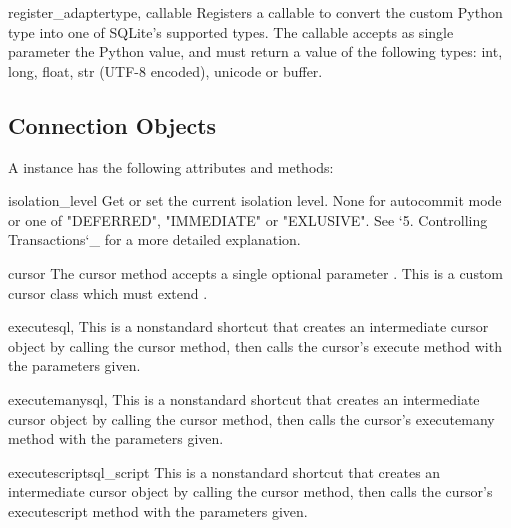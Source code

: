 \begin{funcdesc}{register_adapter}{type, callable}
Registers a callable to convert the custom Python type  into one of
SQLite's supported types. The callable  accepts as single
parameter the Python value, and must return a value of the following types:
int, long, float, str (UTF-8 encoded), unicode or buffer.
\end{funcdesc}


\subsection{Connection Objects \label{sqlite3-Connection-Objects}}

A  instance has the following attributes and methods:

\begin{memberdesc}{isolation_level}
  Get or set the current isolation level. None for autocommit mode or one
  of "DEFERRED", "IMMEDIATE" or "EXLUSIVE". See `5. Controlling
  Transactions`_ for a more detailed explanation.
\end{memberdesc}

\begin{methoddesc}{cursor}{}
  The cursor method accepts a single optional parameter .
  This is a custom cursor class which must extend .
\end{methoddesc}

\begin{methoddesc}{execute}{sql, }
This is a nonstandard shortcut that creates an intermediate cursor object by
calling the cursor method, then calls the cursor's execute method with the
parameters given.
\end{methoddesc}

\begin{methoddesc}{executemany}{sql, }
This is a nonstandard shortcut that creates an intermediate cursor object by
calling the cursor method, then calls the cursor's executemany method with the
parameters given.
\end{methoddesc}

\begin{methoddesc}{executescript}{sql_script}
This is a nonstandard shortcut that creates an intermediate cursor object by
calling the cursor method, then calls the cursor's executescript method with the
parameters given.
\end{methoddesc}

